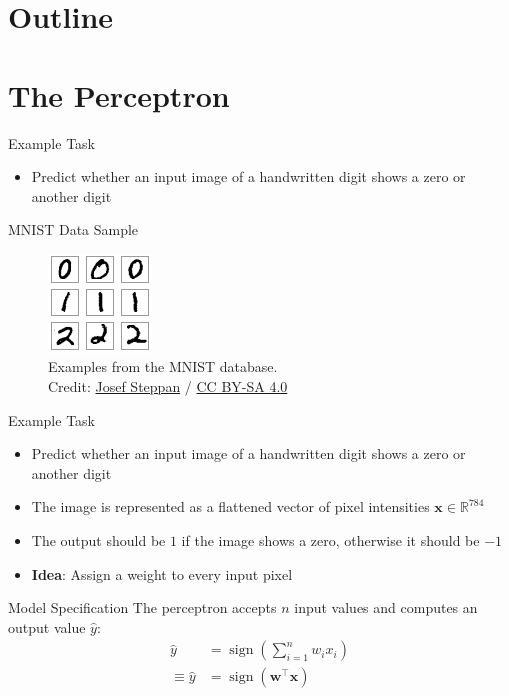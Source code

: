 \documentclass{beamer}
\DeclareMathOperator{\sign}{sign}
\begin{document}
	\section{Outline}
	\section{The Perceptron}
	\begin{frame}{Example Task}
		\begin{itemize}
			\item<1-> Predict whether an input image of a handwritten digit shows a zero or another digit
		\end{itemize}
	\end{frame}
	\begin{frame}{MNIST Data Sample}
		\begin{figure}
			\includegraphics[scale=1.6]{img/mnist}
			\caption{Examples from the {MNIST} database. \\Credit: 
				\href{https://commons.wikimedia.org/wiki/File:MnistExamples.png}{Josef Steppan}
				/ \href{https://creativecommons.org/licenses/by-sa/4.0/deed.en}{CC BY-SA 4.0}}
		\end{figure}
	\end{frame}
	\begin{frame}{Example Task}
		\begin{itemize}
			\item <1-> Predict whether an input image of a handwritten digit shows a zero or another digit
			\item <1-> The image is represented as a flattened vector of pixel intensities $\bm{x} \in \mathbb{R}^{784}$
			\item <2-> The output should be $1$ if the image shows a zero, otherwise it should be $-1$
			\item <3-> \textbf{Idea}: Assign a weight to every input pixel
		\end{itemize}
	\end{frame}
	\begin{frame}{Model Specification}
		The perceptron accepts $n$ input values and computes an output value $\hat{y}$:
		\begin{equation}
			\begin{split}
			\hat{y} &= \sign\left (\sum_{i=1}^{n} w_ix_i\right )\\
			\equiv \hat{y} &= \sign\left (\bm{w}^\top\bm{x}\right )
			\end{split}
		\end{equation}
	\end{frame}
\end{document}
